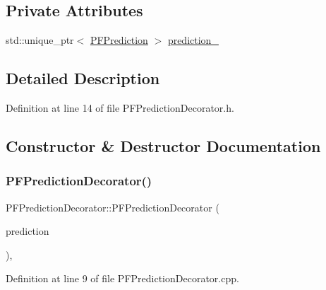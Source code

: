 \subsection*{Private Attributes}
\begin{DoxyCompactItemize}
\item 
std\+::unique\+\_\+ptr$<$ \mbox{\hyperlink{classbfl_1_1PFPrediction}{P\+F\+Prediction}} $>$ \mbox{\hyperlink{classbfl_1_1PFPredictionDecorator_a95f122f6fb7e69c436ae221c40d1c515}{prediction\+\_\+}}
\end{DoxyCompactItemize}


\subsection{Detailed Description}


Definition at line 14 of file P\+F\+Prediction\+Decorator.\+h.



\subsection{Constructor \& Destructor Documentation}
\mbox{\label{classbfl_1_1PFPredictionDecorator_ab2b0e6cdba28a84750be81633a1a0d17}} 
\subsubsection{\texorpdfstring{P\+F\+Prediction\+Decorator()}{PFPredictionDecorator()}\hspace{0.1cm}{\footnotesize\ttfamily [1/2]}}
{\footnotesize\ttfamily P\+F\+Prediction\+Decorator\+::\+P\+F\+Prediction\+Decorator (\begin{DoxyParamCaption}\item[{std\+::unique\+\_\+ptr$<$ \mbox{\hyperlink{classbfl_1_1PFPrediction}{P\+F\+Prediction}} $>$}]{prediction }\end{DoxyParamCaption})\hspace{0.3cm}{\ttfamily [protected]}, {\ttfamily [noexcept]}}



Definition at line 9 of file P\+F\+Prediction\+Decorator.\+cpp.

